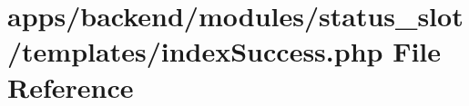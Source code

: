 \hypertarget{backend_2modules_2status__slot_2templates_2index_success_8php}{\section{apps/backend/modules/status\-\_\-slot/templates/index\-Success.php File Reference}
\label{backend_2modules_2status__slot_2templates_2index_success_8php}
}
